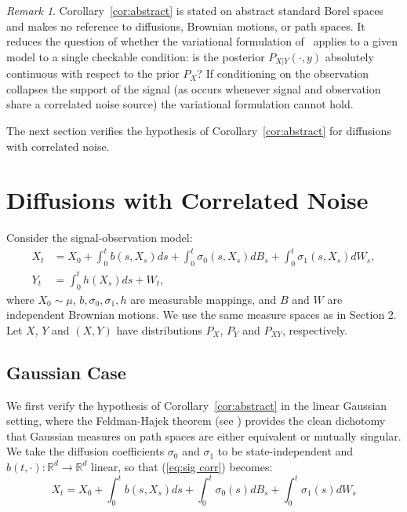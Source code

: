 \documentclass[12pt]{amsart}
\theoremstyle{definition}
\theoremstyle{remark}
\newtheorem{remark}{Remark}
\begin{document}
\begin{remark}
    Corollary~\ref{cor:abstract} is stated on abstract standard Borel spaces and makes no reference to diffusions, Brownian motions, or path spaces. It reduces the question of whether the variational formulation of~\cite{mitter2003variational} applies to a given model to a single checkable condition: is the posterior $P_{X|Y}(\cdot, y)$ absolutely continuous with respect to the prior $P_X$? If conditioning on the observation collapses the support of the signal (as occurs whenever signal and observation share a correlated noise source) the variational formulation cannot hold.
\end{remark}

The next section verifies the hypothesis of Corollary~\ref{cor:abstract} for diffusions with correlated noise.

\section{Diffusions with Correlated Noise}

Consider the signal-observation model:
\begin{align}
    \label{eq:sig corr}
    X_t &= X_0 + \int_0^tb(s,X_s)ds+\int_0^t\sigma_0(s,X_s)dB_s+\int_0^t\sigma_1(s,X_s)dW_s,\\
    \label{eq:obs corr}
    Y_t &= \int_0^th(X_s)ds + W_t,
\end{align}
where $X_0\sim \mu$, $b,\sigma_0,\sigma_1,h$ are measurable mappings, and $B$ and $W$ are independent Brownian motions. We use the same measure spaces as in Section 2. Let $X$, $Y$ and $(X,Y)$ have distributions $P_X$, $P_Y$ and $P_{XY}$, respectively.


\subsection{Gaussian Case}

We first verify the hypothesis of Corollary~\ref{cor:abstract} in the linear Gaussian setting, where the Feldman-Hajek theorem (see \cite[Theorem 2.7.2]{bogachev1998gaussian}) provides the clean dichotomy that Gaussian measures on path spaces are either equivalent or mutually singular. We take the diffusion coefficients $\sigma_0$ and $\sigma_1$ to be state-independent and $b(t,\cdot):\mathbb{R}^d\to\mathbb{R}^d$ linear, so that (\ref{eq:sig corr}) becomes:
\begin{equation}
    \label{eq:sig gaussian}
    X_t = X_0 + \int_0^tb(s,X_s)ds+\int_0^t\sigma_0(s)dB_s+\int_0^t\sigma_1(s)dW_s
\end{equation}
\end{document}
